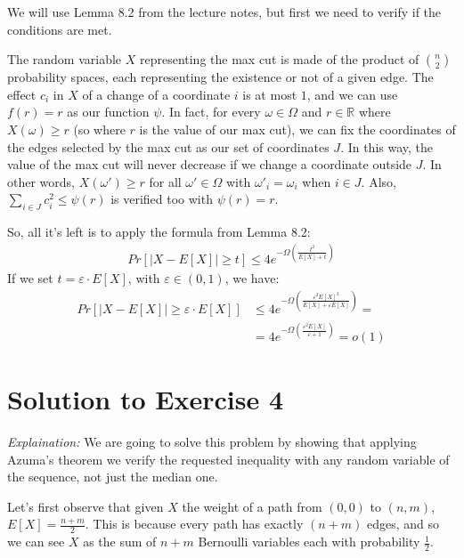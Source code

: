 \documentclass[a4paper,german]{article}
\begin{document}
\vspace{1em}

We will use Lemma 8.2 from the lecture notes, but first we need to verify
if the conditions are met. 

The random variable $X$ representing the max cut is made of the product of ${n
\choose 2}$ probability spaces, each representing the existence or not of a
given edge. The effect $c_i$ in $X$ of a change of a coordinate $i$ is at most
$1$, and we can use $f(r) = r$ as our function $\psi$. In fact, for every
$\omega \in \Omega $ and $r \in \mathbb{R}$ where $X(\omega) \geq r$ (so where
$r$ is the value of our max cut), we can fix the coordinates of the edges
selected by the max cut as our set of coordinates $J$. In this way, the value
of the max cut will never decrease if we change a coordinate outside $J$.
In other words, $X(\omega') \geq r$ for all $\omega' \in \Omega$ with 
$\omega'_i = \omega_i$ when $i \in J$. Also, $\sum_{i \in J} c_i^2 \leq \psi(r)$ is verified too with $\psi(r) = r$.

So, all it's left is to apply the formula from Lemma 8.2:
\begin{align*}
	Pr[| X - E[X] | \geq t ] \leq 4e^{-\Omega\left( \frac{t^2}{E[X] + t} \right)}
\end{align*}
If we set $t = \varepsilon \cdot E[X]$, with $\varepsilon \in (0,1)$, we have:
\begin{align*}
	Pr[| X - E[X] | \geq \varepsilon \cdot E[X] ] &\leq 4e^{-\Omega\left( \frac{\varepsilon^2 E[X]^2}{E[X] + \varepsilon E[X]} \right)} = \\
	&= 4e^{-\Omega\left( \frac{\varepsilon^2 E[X]}{\varepsilon + 1} \right)} = o(1)
\end{align*}






\section*{Solution to Exercise 4}
\emph{Explaination:} We are going to solve this problem by showing that applying Azuma's theorem we verify the requested
inequality with any random variable of the sequence, not just the median one.

\vspace{1em}

Let's first observe that given $X$ the weight of a path from $(0,0)$ to $(n,m)$, $E[X] = \frac{n+m}{2}$. This is because 
every path has exactly $(n+m)$ edges, and so we can see $X$ as the sum of $n+m$ Bernoulli variables each with 
probability $ \frac{ 1 }{2}$.
\end{document}
